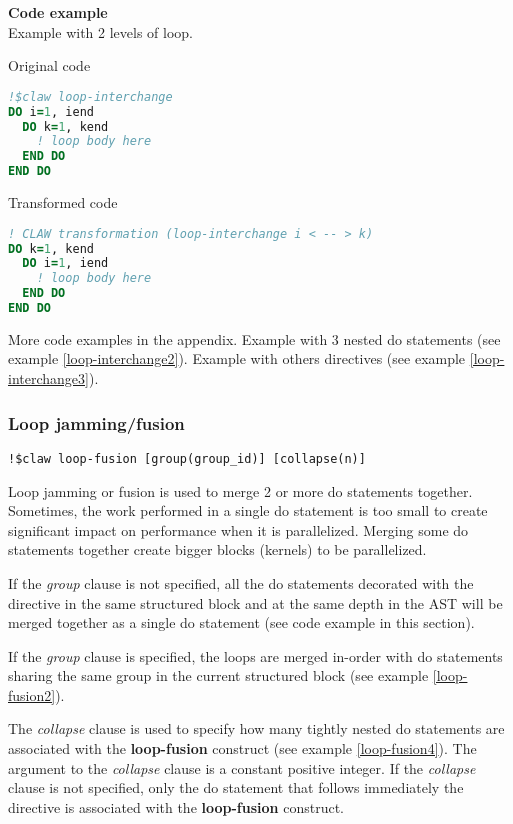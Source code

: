\textbf{Code example}\\\label{loop-interchange1}
Example with 2 levels of loop.

Original code
\begin{lstlisting}[language=Fortran]
!$claw loop-interchange
DO i=1, iend
  DO k=1, kend
    ! loop body here
  END DO
END DO
\end{lstlisting}

Transformed code
\begin{lstlisting}[language=Fortran]
! CLAW transformation (loop-interchange i < -- > k)
DO k=1, kend
  DO i=1, iend
    ! loop body here
  END DO
END DO
\end{lstlisting}

More code examples in the appendix. Example with 3 nested do statements (see
example \ref{loop-interchange2}). Example with others directives (see example
\ref{loop-interchange3}).

\subsubsection{Loop jamming/fusion}
\begin{lstlisting}
!$claw loop-fusion [group(group_id)] [collapse(n)]
\end{lstlisting}

Loop jamming or fusion is used to merge 2 or more do statements together.
Sometimes, the work performed in a single do statement is too small to create
significant impact on performance when it is parallelized. Merging some do
statements together create bigger blocks (kernels) to be parallelized.

If the \textit{group} clause is not specified, all the do statements decorated
with the directive in the same structured block and at the same depth in the AST
will be merged together as a single do statement (see code example in this
section).

If the \textit{group} clause is specified, the loops are merged in-order with do
statements sharing the same group in the current structured block (see example
\ref{loop-fusion2}).

The \textit{collapse} clause is used to specify how many tightly nested do
statements are associated with the \textbf{loop-fusion} construct (see example
\ref{loop-fusion4}). The argument to the \textit{collapse} clause is a constant
positive integer. If the \textit{collapse} clause is not specified, only the do
statement that follows immediately the directive is associated with the
\textbf{loop-fusion} construct.

